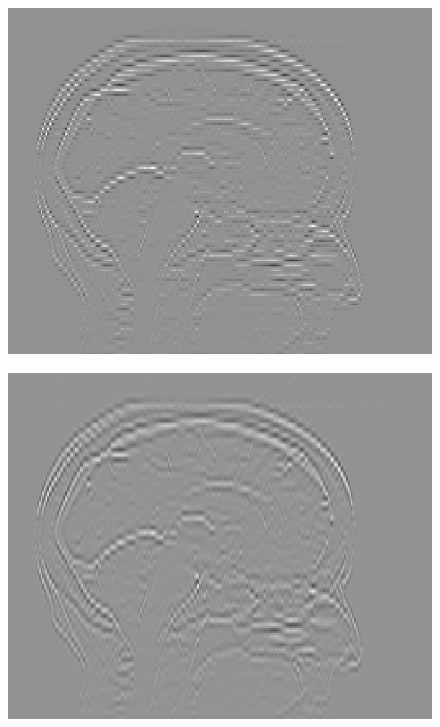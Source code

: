 \documentclass[fleqn,a4paper,oneside,openany]{book}
\begin{document}
\begin{figure}
\begin{minipage}[b]{150pt}
     \label{fig:radiomics_spline_2mm_high_pass}
     \hspace{100pt}
   \end{minipage}
   \begin{minipage}[b]{150pt}
     \centering
     \includegraphics[trim = 0 0 0 0, clip, scale=0.4]{radiomics_filtering/interpolation_image_hi_3mm_1_hi.png}
     \label{fig:radiomics_linear_3mm_high_pass}
     \hspace{100pt}
   \end{minipage}
   \begin{minipage}[b]{150pt}
     \centering
     \includegraphics[trim = 0 0 0 0, clip, scale=0.4]{radiomics_filtering/interpolation_image_hi_3mm_3_hi.png}

\end{minipage}
\end{figure}
\end{document}

